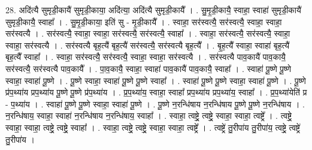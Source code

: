 \documentclass[17pt]{extarticle}
\begin{document}
28. अदि॑त्यै सुमृडी॒कायै॑ सुमृडी॒काया॒ अदि॑त्या॒ अदि॑त्यै सुमृडी॒कायै᳚ । . सु॒मृ॒डी॒कायै॒ स्वाहा॒ स्वाहा॑ सुमृडी॒कायै॑ सुमृडी॒कायै॒ स्वाहा᳚ । . सु॒मृ॒डी॒काया॒ इति॑ सु - मृ॒डी॒कायै᳚ । . स्वाहा॒ सर॑स्वत्यै॒ सर॑स्वत्यै॒ स्वाहा॒ स्वाहा॒ सर॑स्वत्यै । . सर॑स्वत्यै॒ स्वाहा॒ स्वाहा॒ सर॑स्वत्यै॒ सर॑स्वत्यै॒ स्वाहा᳚ । . स्वाहा॒ सर॑स्वत्यै॒ सर॑स्वत्यै॒ स्वाहा॒ स्वाहा॒ सर॑स्वत्यै । . सर॑स्वत्यै बृह॒त्यै॑ बृह॒त्यै॑ सर॑स्वत्यै॒ सर॑स्वत्यै बृह॒त्यै᳚ । . बृ॒ह॒त्यै᳚ स्वाहा॒ स्वाहा॑ बृह॒त्यै॑ बृह॒त्यै᳚ स्वाहा᳚ । . स्वाहा॒ सर॑स्वत्यै॒ सर॑स्वत्यै॒ स्वाहा॒ स्वाहा॒ सर॑स्वत्यै । . सर॑स्वत्यै पाव॒कायै॑ पाव॒कायै॒ सर॑स्वत्यै॒ सर॑स्वत्यै पाव॒कायै᳚ । . पा॒व॒कायै॒ स्वाहा॒ स्वाहा॑ पाव॒कायै॑ पाव॒कायै॒ स्वाहा᳚ । . स्वाहा॑ पू॒ष्णे पू॒ष्णे स्वाहा॒ स्वाहा॑ पू॒ष्णे । . पू॒ष्णे स्वाहा॒ स्वाहा॑ पू॒ष्णे पू॒ष्णे स्वाहा᳚ । . स्वाहा॑ पू॒ष्णे पू॒ष्णे स्वाहा॒ स्वाहा॑ पू॒ष्णे । . पू॒ष्णे प्र॑प॒थ्या॑य प्रप॒थ्या॑य पू॒ष्णे पू॒ष्णे प्र॑प॒थ्या॑य । . प्र॒प॒थ्या॑य॒ स्वाहा॒ स्वाहा᳚ प्रप॒थ्या॑य प्रप॒थ्या॑य॒ स्वाहा᳚ । . प्र॒प॒थ्या॑येति॑ प्र - प॒थ्या॑य । . स्वाहा॑ पू॒ष्णे पू॒ष्णे स्वाहा॒ स्वाहा॑ पू॒ष्णे । . पू॒ष्णे न॒रन्धि॑षाय न॒रन्धि॑षाय पू॒ष्णे पू॒ष्णे न॒रन्धि॑षाय । . न॒रन्धि॑षाय॒ स्वाहा॒ स्वाहा॑ न॒रन्धि॑षाय न॒रन्धि॑षाय॒ स्वाहा᳚ । . स्वाहा॒ त्वष्ट्रे॒ त्वष्ट्रे॒ स्वाहा॒ स्वाहा॒ त्वष्ट्रे᳚ । . त्वष्ट्रे॒ स्वाहा॒ स्वाहा॒ त्वष्ट्रे॒ त्वष्ट्रे॒ स्वाहा᳚ । . स्वाहा॒ त्वष्ट्रे॒ त्वष्ट्रे॒ स्वाहा॒ स्वाहा॒ त्वष्ट्रे᳚ । . त्वष्ट्रे॑ तु॒रीपा॑य तु॒रीपा॑य॒ त्वष्ट्रे॒ त्वष्ट्रे॑ तु॒रीपा॑य । \newline
\end{document}
